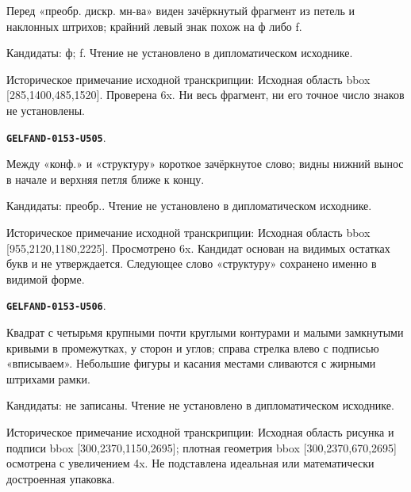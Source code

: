 \documentclass[11pt]{article}
\theoremstyle{definition}
\theoremstyle{remark}
\begin{document}
Перед «преобр. дискр. мн-ва» виден зачёркнутый фрагмент из петель и наклонных штрихов; крайний левый знак похож на ф либо f.\par
Кандидаты: ф; f. Чтение не установлено в дипломатическом исходнике.\par
Историческое примечание исходной транскрипции: Исходная область bbox [285,1400,485,1520]. Проверена 6x. Ни весь фрагмент, ни его точное число знаков не установлены.\par\medskip
\par\noindent\leavevmode{}\label{GELFAND-0153-U505}\label{GELFAND-P001410:structure-cancellation:note}\textbf{\texttt{GELFAND-0153-U505}}.\nopagebreak[4]\par
Между «конф.» и «структуру» короткое зачёркнутое слово; видны нижний вынос в начале и верхняя петля ближе к концу.\par
Кандидаты: преобр.. Чтение не установлено в дипломатическом исходнике.\par
Историческое примечание исходной транскрипции: Исходная область bbox [955,2120,1180,2225]. Просмотрено 6x. Кандидат основан на видимых остатках букв и не утверждается. Следующее слово «структуру» сохранено именно в видимой форме.\par\medskip
\par\noindent\leavevmode{}\label{GELFAND-0153-U506}\label{GELFAND-P001410:circle-packing:note}\textbf{\texttt{GELFAND-0153-U506}}.\nopagebreak[4]\par
Квадрат с четырьмя крупными почти круглыми контурами и малыми замкнутыми кривыми в промежутках, у сторон и углов; справа стрелка влево с подписью «вписываем». Небольшие фигуры и касания местами сливаются с жирными штрихами рамки.\par
Кандидаты: не записаны. Чтение не установлено в дипломатическом исходнике.\par
Историческое примечание исходной транскрипции: Исходная область рисунка и подписи bbox [300,2370,1150,2695]; плотная геометрия bbox [300,2370,670,2695] осмотрена с увеличением 4x. Не подставлена идеальная или математически достроенная упаковка.\par\medskip
\end{document}
